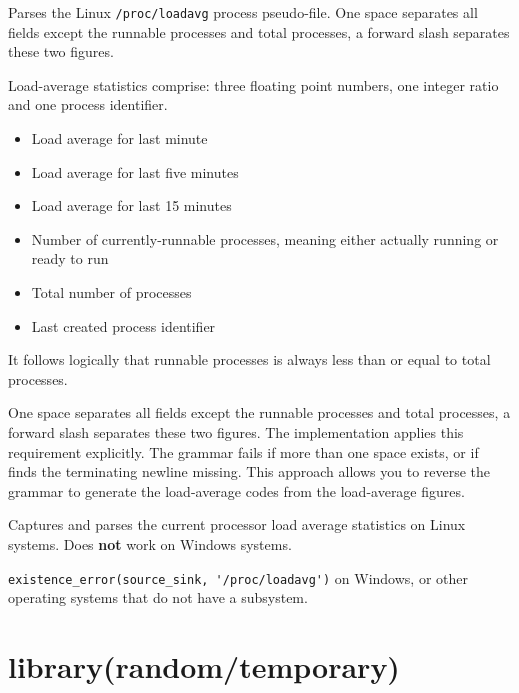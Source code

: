 \begin{description}
Parses the Linux \verb$/proc/loadavg$ process pseudo-file. One space
separates all fields except the runnable processes and total
processes, a forward slash separates these two figures.

Load-average statistics comprise: three floating point numbers, one
integer ratio and one process identifier.

\begin{itemize}
    \item Load average for last minute
    \item Load average for last five minutes
    \item Load average for last 15 minutes
    \item Number of currently-runnable processes, meaning either
actually running or ready to run
    \item Total number of processes
    \item Last created process identifier
\end{itemize}

It follows logically that runnable processes is always less than or
equal to total processes.

One space separates all fields except the runnable processes and
total processes, a forward slash separates these two figures. The
implementation applies this requirement explicitly. The grammar
fails if more than one space exists, or if finds the terminating
newline missing. This approach allows you to reverse the grammar to
generate the load-average codes from the load-average figures.

Captures and parses the current processor load average statistics on
Linux systems. Does \textbf{not} work on Windows systems.

\begin{tags}
\verb$existence_error(source_sink, '/proc/loadavg')$ on Windows, or
other operating systems that do not have a  subsystem.
\end{tags}
\end{description}

\chapter{library(random/temporary)}\label{sec:temporary}


